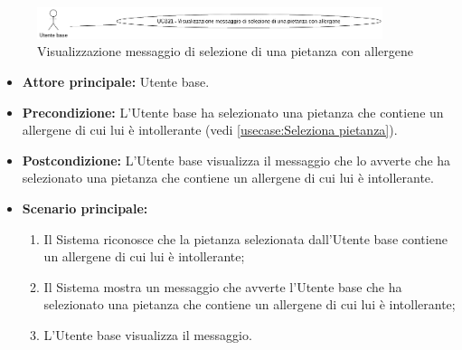 \label{usecase:Visualizzazione messaggio di selezione di una pietanza con allergene}

\begin{figure}[h]
	\centering
	\includegraphics[width=0.9\textwidth]{./uml/UCB21.png} 
	\caption{Visualizzazione messaggio di selezione di una pietanza con allergene}
	\label{fig:UCB20}
  \end{figure}

\begin{itemize}
	\item \textbf{Attore principale:} Utente base.

	\item \textbf{Precondizione:}
	      L'Utente base ha selezionato una pietanza che contiene un allergene di cui lui è intollerante (vedi \autoref{usecase:Seleziona pietanza}).

	\item \textbf{Postcondizione:}
	      L'Utente base visualizza il messaggio che lo avverte che ha selezionato una pietanza che contiene un allergene di cui lui è intollerante.

	\item \textbf{Scenario principale:}
	      \begin{enumerate}
		      \item Il Sistema riconosce che la pietanza selezionata dall'Utente base contiene un allergene di cui lui è intollerante;
		      \item Il Sistema mostra un messaggio che avverte l'Utente base che ha selezionato una pietanza che contiene un allergene di cui lui è intollerante;
		      \item L'Utente base visualizza il messaggio.
	      \end{enumerate}
\end{itemize}
